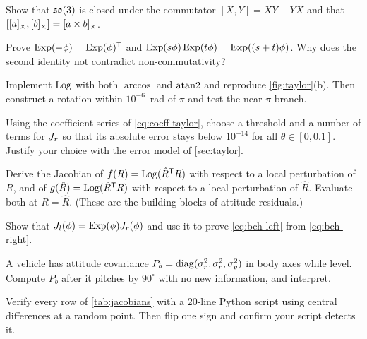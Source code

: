 \begin{exercises}
  \item Show that $\mathfrak{so}(3)$ is closed under the commutator $[X, Y] = XY - YX$ and that
        $[[a]_{\times}, [b]_{\times}] = [a\times b]_{\times}$.
  \item Prove $\operatorname{Exp}(-\phi) = \operatorname{Exp}(\phi)^{\mathsf{T}}$ and $\operatorname{Exp}(s\phi)\operatorname{Exp}(t\phi) = \operatorname{Exp}((s+t)\phi)$. Why does the second
        identity not contradict non-commutativity?
  \item Implement $\operatorname{Log}$ with both $\arccos$ and $\operatorname{atan2}$ and reproduce \cref{fig:taylor}(b).
        Then construct a rotation within $10^{-6}$~rad of $\pi$ and test the near-$\pi$ branch.
  \item Using the coefficient series of \eqref{eq:coeff-taylor}, choose a threshold and a number of terms
        for $J_r$ so that its absolute error stays below $10^{-14}$ for all $\theta \in [0, 0.1]$. Justify
        your choice with the error model of \cref{sec:taylor}.
  \item Derive the Jacobian of $f(R) = \operatorname{Log}(\hat R^{\mathsf{T}} R)$ with respect to a local perturbation of $R$, and of
        $g(\hat R) = \operatorname{Log}(\hat R^{\mathsf{T}} R)$ with respect to a local perturbation of $\hat R$. Evaluate both at
        $R = \hat R$. (These are the building blocks of attitude residuals.)
  \item Show that $J_l(\phi) = \operatorname{Exp}(\phi)J_r(\phi)$ and use it to prove \eqref{eq:bch-left} from
        \eqref{eq:bch-right}.
  \item A vehicle has attitude covariance $P_b = \operatorname{diag}(\sigma_r^2, \sigma_r^2, \sigma_y^2)$ in body axes while
        level. Compute $P_b$ after it pitches by $90^\circ$ with no new information, and interpret.
  \item Verify every row of \cref{tab:jacobians} with a 20-line Python script using central differences at
        a random point. Then flip one sign and confirm your script detects it.
\end{exercises}

